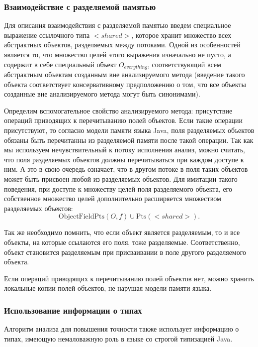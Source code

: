 \documentclass[14pt,titlepage]{extarticle}
\newcommand{\Pts}[1]{\textrm{Pts}(#1)}
\newcommand{\OFPts}[2]{\textrm{ObjectFieldPts}(#1, #2)}
\begin{document}
      \subsubsection{Взаимодействие с разделяемой памятью}

      Для описания взаимодействия с разделяемой памятью введем специальное
      выражение ссылочного типа ${<}shared{>}$, которое хранит множество всех
      абстрактных объектов, разделяемых между потоками. Одной из особенностей
      является то, что множество целей этого выражения изначально не пусто, а
      содержит в себе специальный объект $O_{everything}$, соответствующий
      всем абстрактным объектам созданным вне анализируемого метода (введение
      такого объекта соответствует консервативному предположению о том, что все
      объекты созданные вне анализируемого метода могут быть синонимами).

      Определим вспомогательное свойство анализируемого метода: присутствие
      операций приводящих к перечитыванию полей объектов. Если такие операции
      присутствуют, то согласно модели памяти языка Java, поля разделяемых
      объектов обязаны быть перечитанны из разделяемой памяти после такой
      операции. Так как мы используем нечувствительный к потоку исполнения
      анализ, можно считать, что поля разделяемых объектов должны
      перечитываться при каждом доступе к ним. А это в свою очередь означает,
      что в другом потоке в поля таких объектов может быть присвоен любой из
      разделяемых объектов. Для имитации такого поведения, при доступе к
      множеству целей поля разделяемого объекта, его собственное множество
      целей дополнительно расширяется множеством разделяемых объектов:
      \[\OFPts{O}{f} \cup \Pts{{<}shared{>}}.\]

      Так же необходимо помнить, что если объект является разделяемым, то и
      все объекты, на которые ссылаются его поля, тоже разделяемые.
      Соответственно, объект становится разделяемым при присваивании в поле
      другого разделяемого объекта.

      Если операций приводящих к перечитыванию полей объектов нет, можно
      хранить локальные копии полей объектов, не нарушая модели памяти языка.

      \subsubsection{Использование информации о типах}

      Алгоритм анализа для повышения точности также использует информацию о
      типах, имеющую немаловажную роль в языке со строгой типизацией Java.
\end{document}
